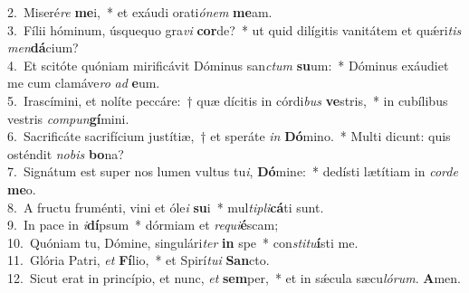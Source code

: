 {2.~}Miseré\textit{re} \textbf{me}i,~* et exáudi orati\textit{ó}\textit{nem} \textbf{me}am.\\
{3.~}Fílii hóminum, úsquequo gra\textit{vi} \textbf{cor}de?~* ut quid dilígitis vanitátem et quǽri\textit{tis} \textit{men}\textbf{dá}cium?\\
{4.~}Et scitóte quóniam mirificávit Dóminus san\textit{ctum} \textbf{su}um:~* Dóminus exáudiet me cum clamáve\textit{ro} \textit{ad} \textbf{e}um.\\
{5.~}Irascímini, et nolíte peccáre:~† quæ dícitis in córdi\textit{bus} \textbf{ve}stris,~* in cubílibus vestris \textit{com}\textit{pun}\textbf{gí}mini.\\
{6.~}Sacrificáte sacrifícium justítiæ,~† et speráte \textit{in} \textbf{Dó}mino.~* Multi dicunt: quis osténdit \textit{no}\textit{bis} \textbf{bo}na?\\
{7.~}Signátum est super nos lumen vultus tu\textit{i}, \textbf{Dó}mine:~* dedísti lætítiam in \textit{cor}\textit{de} \textbf{me}o.\\
{8.~}A fructu fruménti, vini et óle\textit{i} \textbf{su}i~* mul\textit{ti}\textit{pli}\textbf{cá}ti sunt.\\
{9.~}In pace in \textit{i}\textbf{dí}psum~* dórmiam et \textit{re}\textit{qui}\textbf{é}scam;\\
{10.~}Quóniam tu, Dómine, singulári\textit{ter} \textbf{in} spe~* con\textit{sti}\textit{tu}\textbf{í}sti me.\\
{11.~}Glória Patri, \textit{et} \textbf{Fí}lio,~* et Spirí\textit{tu}\textit{i} \textbf{San}cto.\\
{12.~}Sicut erat in princípio, et nunc, \textit{et} \textbf{sem}per,~* et in sǽcula sæcu\textit{ló}\textit{rum}. \textbf{A}men.\\
